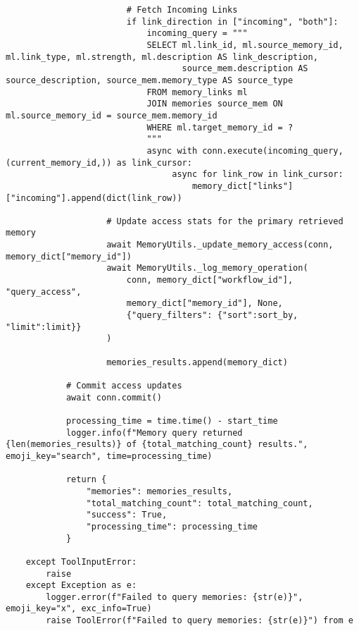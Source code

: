\documentclass[12pt,a4paper]{article}
\begin{document}
\begin{pageablecode}
\begin{verbatim}
                        # Fetch Incoming Links
                        if link_direction in ["incoming", "both"]:
                            incoming_query = """
                            SELECT ml.link_id, ml.source_memory_id, ml.link_type, ml.strength, ml.description AS link_description,
                                   source_mem.description AS source_description, source_mem.memory_type AS source_type
                            FROM memory_links ml
                            JOIN memories source_mem ON ml.source_memory_id = source_mem.memory_id
                            WHERE ml.target_memory_id = ?
                            """
                            async with conn.execute(incoming_query, (current_memory_id,)) as link_cursor:
                                 async for link_row in link_cursor:
                                     memory_dict["links"]["incoming"].append(dict(link_row))

                    # Update access stats for the primary retrieved memory
                    await MemoryUtils._update_memory_access(conn, memory_dict["memory_id"])
                    await MemoryUtils._log_memory_operation(
                        conn, memory_dict["workflow_id"], "query_access",
                        memory_dict["memory_id"], None,
                        {"query_filters": {"sort":sort_by, "limit":limit}}
                    )

                    memories_results.append(memory_dict)

            # Commit access updates
            await conn.commit()

            processing_time = time.time() - start_time
            logger.info(f"Memory query returned {len(memories_results)} of {total_matching_count} results.", emoji_key="search", time=processing_time)

            return {
                "memories": memories_results,
                "total_matching_count": total_matching_count,
                "success": True,
                "processing_time": processing_time
            }

    except ToolInputError:
        raise
    except Exception as e:
        logger.error(f"Failed to query memories: {str(e)}", emoji_key="x", exc_info=True)
        raise ToolError(f"Failed to query memories: {str(e)}") from e
    

\end{verbatim}
\end{pageablecode}
\end{document}
